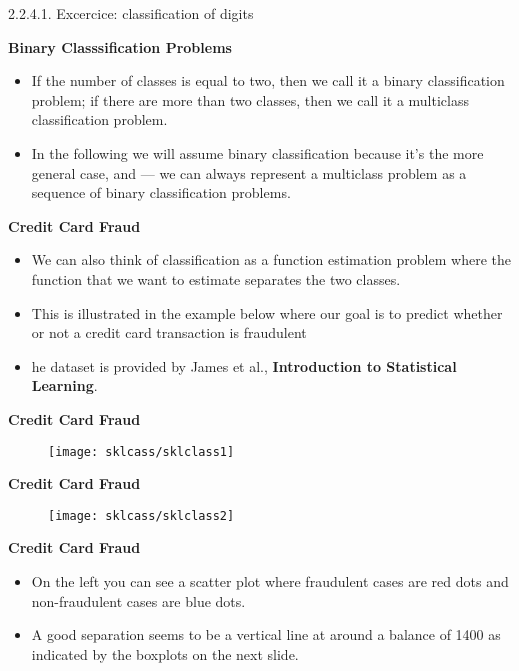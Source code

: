 2.2.4.1. Excercice: classification of digits\documentclass[MASTER.tex]{subfiles}
\begin{document}
 	\Large
 	\textbf{Binary Classsification Problems}\\
 	\begin{itemize}
\item If the number of classes is equal to two, then we call it a binary classification problem; if there are more than two classes, then we call it a multiclass classification problem.
\item  In the following we will assume binary classification because it’s the more general case, and — we can always represent a multiclass problem as a sequence of binary classification problems.
\end{itemize}



	\Large
\textbf{Credit Card Fraud}
\begin{itemize}
\item We can also think of classification as a function estimation problem where the function that we want to estimate separates the two classes. 
\item This is illustrated in the example below where our goal is to predict whether or not a credit card transaction is fraudulent
\item he dataset is provided by James et al., \textbf{Introduction to Statistical Learning}.
\end{itemize}




	\Large
\vspace{-1cm}
\textbf{Credit Card Fraud}
\begin{figure}
\centering
\texttt{[image: sklcass/sklclass1]}

\end{figure}



	\Large
\textbf{Credit Card Fraud}
\begin{figure}
\centering
\texttt{[image: sklcass/sklclass2]}

\end{figure}




	\Large
	\textbf{Credit Card Fraud}
	\begin{itemize}
\item 	On the left you can see a scatter plot where fraudulent cases are red dots and non-fraudulent cases are blue dots. 
\item A good separation seems to be a vertical line at around a balance of 1400 as indicated by the boxplots on the next slide.
	\end{itemize}
	
\end{document}
